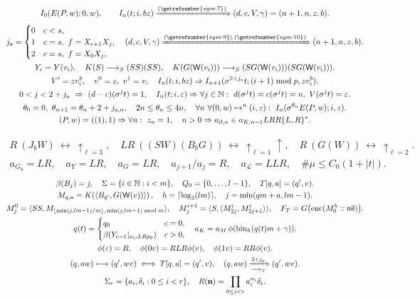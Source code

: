 \documentclass[10pt,letterpaper]{article}
\newcommand{\N}{\mathbb N}
\newcommand{\eps}{\varepsilon}
\newcommand{\pair}[2]{\langle #1,#2\rangle}
\newcommand{\R}{\longrightarrow_{S}}
\newcommand{\wt}{\mathsf W}
\begin{document}
\begin{gather}
I_0(E(P,w);0,w),\qquad
 I_n(t;i,bz)\xRightarrow{(\getrefnumber{sym:7})} (d,c,V,\gamma)=(n+1,n,z,b).\\
j_{\rm a}=\begin{cases}0&c<s,\\1&c=s,\ f=X_{r+1}X_j,\\2&c=s,\ f=X_0X_j,\end{cases}\quad
(d,c,V,\gamma)\xRightarrow{(\getrefnumber{sym:9}),(\getrefnumber{sym:10})}(n+1,n,z,b).\\
Y_c=Y(v_i),\quad K(S)\R(SS)(SS),\quad
K(G(\wt(v_i)))\R(SG(\wt(v_i)))(SG(\wt(v_i))).\\
V'=zv_i^b,\quad v^0=\eps,\ v^1=v,\quad
I_n(t;i,bz)\Rightarrow I_{n+1}(\sigma^{2+j_{\rm a}}t;(i+1)\bmod p,zv_i^b).\\
0<j<2+j_{\rm a}\ \Rightarrow\ (d-c)(\sigma^jt)=1,\quad
I_n(t;i,\eps)\Rightarrow\forall j\in\N:\ d(\sigma^jt)=c(\sigma^jt)=n,\ V(\sigma^jt)=\eps.\\
\theta_0=0,\ \theta_{n+1}=\theta_n+2+j_{{\rm a},n},\quad
2n\le\theta_n\le4n,\quad
\forall n\ \forall (0,w)\mapsto^n(i,z):\
 I_n(\sigma^{\theta_n}E(P,w);i,z).\\
(P,w)=((1),1)\Rightarrow\forall n:\ z_n=1,\quad
n>0\Rightarrow a_{{\partial},n}\in a_{{K},n-1} LR R\{L,R\}^{*}.
\end{gather}

\begin{gather}
R\ (J_bW)\ \leftrightarrow\ \uparrow_{\ell=3},\quad
LR\ ((SW)(B_bG))\ \leftrightarrow\ \uparrow_{\ell=1}\uparrow,\quad
R\ (G(W))\ \leftrightarrow\ \uparrow_{\ell=2}.\\
a_{G_0}=LR,\quad a_Y=LR,\quad
a_G=LR,\quad a_{j+1}/a_j=R,\quad a_{\mathcal L}=LLR,\quad
\#\mu\le C_0(1+|t|).
\end{gather}
\begin{gather}
\beta(B_j)=j,\quad \Sigma=\{i\in\N:i<m\},\quad Q_0=\{0,\dots,l-1\},\quad
 T[q,a]=(q',v).\\
M_{q,a}=K\!\left(\pair{B_{q'}}{G(\wt(v))}\right),\quad
h=\lceil\log_2(lm)\rceil,\quad  j=\min(qm+a, lm-1).\\
M^0_j=\pair{SS}{M_{\lfloor\min(j,lm-1)/m\rfloor,\,\min(j,lm-1)\bmod m}},\quad
M^{i+1}_j=\pair S{\pair{M^i_{2j}}{M^i_{2j+1}}},\quad
F_T=G\bigl(\operatorname{enc}(M^h_0::\mathsf{nil})\bigr).\\
q(t)=\begin{cases}q_0&c=0,\\ \beta(Y_{c-1}|_{a_{O}LR\rho_0})&c>0,\end{cases}\quad
a_K=a_{M}\,\phi(\mathrm{bin}_h(q(t)m+\gamma)).\\
\phi(\eps)=R,\quad
\phi(0v)=RLR\phi(v),\quad
\phi(1v)=RR\phi(v).\\
(q,aw)\longmapsto(q',wv)\iff T[q,a]=(q',v),\quad
(q,aw)\xRightarrow[\R]{2+j_{\rm a}}(q',wv).\\
\Sigma_r=\{a_i,\delta_i:0\le i<r\},\quad
R(\mathbf n)=\prod_{0\le i<r}a_i^{n_i}\delta_i .
\end{gather}
\end{document}
